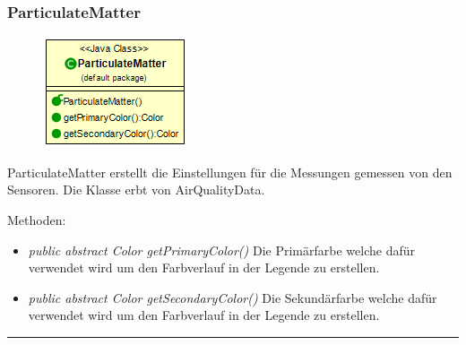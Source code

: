 \subsubsection{ParticulateMatter}
\begin{minipage}{0.3\textwidth}
    \begin{figure}[H]
        {\centering\includegraphics[scale = 0.6
        ]{media/view/airquality/ParticulateMatter_Class.png}}
    \end{figure}
    \end{minipage} \hfill
    \begin{minipage}{0.6\textwidth}
ParticulateMatter erstellt die Einstellungen für die Messungen gemessen von den Sensoren. Die Klasse erbt von AirQualityData.
\end{minipage}
Methoden: \begin{itemize} [noitemsep]
	\item \emph{public abstract Color getPrimaryColor()} Die Primärfarbe welche dafür verwendet wird um den Farbverlauf in der Legende zu erstellen.
	\item \emph{public abstract Color getSecondaryColor()} Die Sekundärfarbe welche dafür verwendet wird um den Farbverlauf in der Legende zu erstellen.
\end{itemize}

\rule{\textwidth}{0.4pt}
